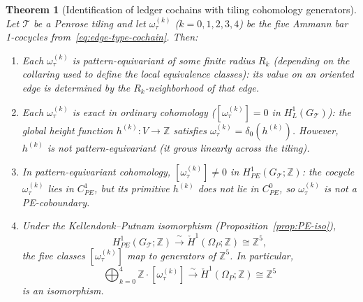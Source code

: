 \documentclass[12pt]{article}
\newtheorem{theorem}{Theorem}[section]
\theoremstyle{definition}
\theoremstyle{remark}
\newcommand{\ZZ}{\mathbb{Z}}
\newcommand{\Hcech}{\check{H}}
\begin{document}
\begin{theorem}[Identification of ledger cochains with tiling cohomology generators]
\label{thm:injection}
Let $\mathcal{T}$ be a Penrose tiling and let $\omega_\tau^{(k)}$ ($k = 0, 1, 2, 3, 4$) be the five Ammann bar 1-cocycles from~\eqref{eq:edge-type-cochain}. Then:
\begin{enumerate}
\item[(i)] Each $\omega_\tau^{(k)}$ is pattern-equivariant of some finite radius $R_k$ (depending on the collaring used to define the local equivalence classes): its value on an oriented edge is determined by the $R_k$-neighborhood of that edge.
\item[(ii)] Each $\omega_\tau^{(k)}$ is exact in ordinary cohomology ($[\omega_\tau^{(k)}] = 0$ in $H^1_L(G_{\mathcal{T}})$): the global height function $h^{(k)}: V \to \ZZ$ satisfies $\omega_\tau^{(k)} = \delta_0(h^{(k)})$. However, $h^{(k)}$ is \emph{not} pattern-equivariant (it grows linearly across the tiling).
\item[(iii)] In pattern-equivariant cohomology, $[\omega_\tau^{(k)}] \neq 0$ in $H^1_{PE}(G_{\mathcal{T}}; \ZZ)$: the cocycle $\omega_\tau^{(k)}$ lies in $C^1_{PE}$, but its primitive $h^{(k)}$ does not lie in $C^0_{PE}$, so $\omega_\tau^{(k)}$ is not a PE-coboundary.
\item[(iv)] Under the Kellendonk--Putnam isomorphism (Proposition~\ref{prop:PE-iso}),
\begin{equation}
H^1_{PE}(G_{\mathcal{T}}; \ZZ) \xrightarrow{\;\sim\;} \Hcech^1(\Omega_P; \ZZ) \cong \ZZ^5,
\label{eq:PE-identification}
\end{equation}
the five classes $[\omega_\tau^{(k)}]$ map to generators of $\ZZ^5$. In particular,
\begin{equation}
\bigoplus_{k=0}^{4} \ZZ \cdot [\omega_\tau^{(k)}] \xrightarrow{\;\sim\;} \Hcech^1(\Omega_P; \ZZ) \cong \ZZ^5
\label{eq:injection-map}
\end{equation}
is an isomorphism.
\end{enumerate}
\end{theorem}
\end{document}
